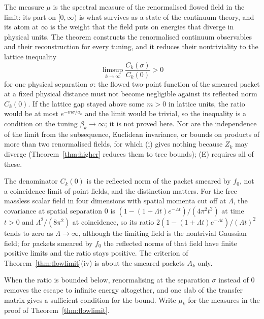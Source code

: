 \documentclass[aps,prd,twocolumn,superscriptaddress,nofootinbib,longbibliography,floatfix,amsmath,amssymb,10pt]{revtex4-2}
\theoremstyle{definition}
\theoremstyle{remark}
\begin{document}
The measure $\mu$ is the spectral measure of the renormalised flowed field in
the limit: its part on $[0,\infty)$ is what survives as a state of the
continuum theory, and its atom at $\infty$ is the weight that the field puts on
energies that diverge in physical units. The theorem constructs the
renormalised continuum observables and their reconstruction for every tuning,
and it reduces their nontriviality to the lattice inequality
\[
\limsup_{k\to\infty}\frac{C_k(\sigma)}{C_k(0)}>0
\]
for one physical separation $\sigma$: the flowed two-point function of the
smeared packet at a fixed physical distance must not become negligible
against its reflected norm $C_k(0)$. If the lattice gap stayed above some $m>0$ in lattice units, the
ratio would be at most $e^{-m\sigma/a_k}$ and the limit would be trivial, so the
inequality is a condition on the tuning $\beta_k\to\infty$; it is not proved
here. Nor are the independence of the limit from the subsequence, Euclidean
invariance, or bounds on products of more than two renormalised fields, for
which (i) gives nothing because $Z_k$ may diverge (Theorem~\ref{thm:higher}
reduces them to tree bounds); (E) requires all of these.

The denominator $C_k(0)$ is the reflected norm of the packet smeared by
$f_0$, not a coincidence limit of point fields, and the distinction matters.
For the free massless scalar field in four dimensions with spatial momenta cut
off at $\Lambda$, the covariance at spatial separation $0$ is
$(1-(1+\Lambda t)e^{-\Lambda t})/(4\pi^2t^2)$ at time $t>0$ and
$\Lambda^2/(8\pi^2)$ at coincidence, so its ratio
$2(1-(1+\Lambda t)e^{-\Lambda t})/(\Lambda t)^2$ tends to zero as
$\Lambda\to\infty$, although the limiting field is the nontrivial Gaussian
field; for packets smeared by $f_0$ the reflected norms of that field have
finite positive limits and the ratio stays positive. The criterion of
Theorem~\ref{thm:flowlimit}(iv) is about the smeared packets $A_k$ only.

When the ratio is bounded below, renormalising at the separation $\sigma$
instead of $0$ removes the escape to infinite energy altogether, and one slab
of the transfer matrix gives a sufficient condition for the bound. Write
$\mu_k$ for the measures in the proof of Theorem~\ref{thm:flowlimit}.
\end{document}
